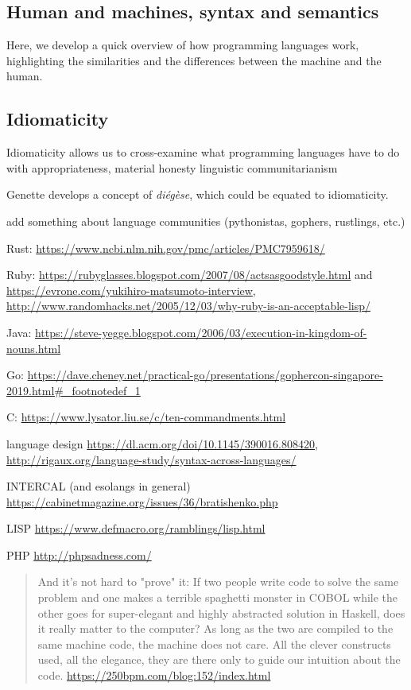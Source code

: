 \subsection{Human and machines, syntax and semantics}
\label{subsec:human-machine-syntax-semantics}

Here, we develop a quick overview of how programming languages work, highlighting the similarities and the differences between the machine and the human.

\subsection{Idiomaticity}
\label{subsec:idiomaticity}

Idiomaticity allows us to cross-examine what programming languages have to do with appropriateness, material honesty linguistic communitarianism

Genette develops a concept of \emph{diégèse}, which could be equated to idiomaticity.

add something about language communities (pythonistas, gophers, rustlings, etc.)

Rust: \url{https://www.ncbi.nlm.nih.gov/pmc/articles/PMC7959618/}

Ruby: \url{https://rubyglasses.blogspot.com/2007/08/actsasgoodstyle.html} and \url{https://evrone.com/yukihiro-matsumoto-interview}, \url{http://www.randomhacks.net/2005/12/03/why-ruby-is-an-acceptable-lisp/}

Java: \url{https://steve-yegge.blogspot.com/2006/03/execution-in-kingdom-of-nouns.html}

Go: \url{https://dave.cheney.net/practical-go/presentations/gophercon-singapore-2019.html#_footnotedef_1}

C: \url{https://www.lysator.liu.se/c/ten-commandments.html}

language design \url{https://dl.acm.org/doi/10.1145/390016.808420}, \url{http://rigaux.org/language-study/syntax-across-languages/}

INTERCAL (and esolangs in general) \url{https://cabinetmagazine.org/issues/36/bratishenko.php}

LISP \url{https://www.defmacro.org/ramblings/lisp.html}

PHP \url{http://phpsadness.com/}

\begin{quote}
    And it's not hard to "prove" it: If two people write code to solve the same problem and one makes a terrible spaghetti monster in COBOL while the other goes for super-elegant and highly abstracted solution in Haskell, does it really matter to the computer? As long as the two are compiled to the same machine code, the machine does not care. All the clever constructs used, all the elegance, they are there only to guide our intuition about the code. \url{https://250bpm.com/blog:152/index.html}
\end{quote}

